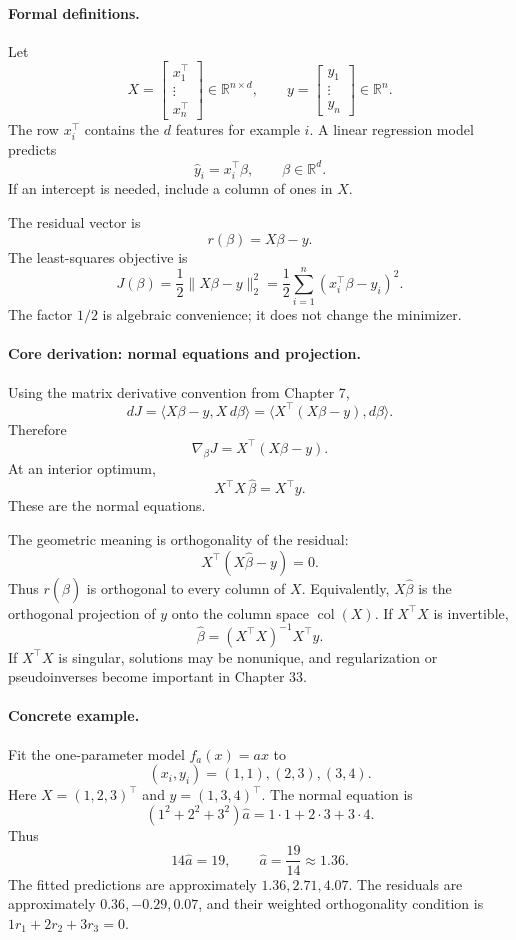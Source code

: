\paragraph{Formal definitions.}
Let
\[
X=
\begin{bmatrix}
x_1^\top\\
\vdots\\
x_n^\top
\end{bmatrix}
\in\mathbb R^{n\times d},
\qquad
y=
\begin{bmatrix}
y_1\\
\vdots\\
y_n
\end{bmatrix}
\in\mathbb R^n.
\]
The row \(x_i^\top\) contains the \(d\) features for example \(i\). A linear regression model predicts
\[
\widehat y_i=x_i^\top\beta,
\qquad
\beta\in\mathbb R^d.
\]
If an intercept is needed, include a column of ones in \(X\).

The residual vector is
\[
r(\beta)=X\beta-y.
\]
The least-squares objective is
\[
\boxed{
J(\beta)=\frac{1}{2}\|X\beta-y\|_2^2
=\frac{1}{2}\sum_{i=1}^n (x_i^\top\beta-y_i)^2.
}
\]
The factor \(1/2\) is algebraic convenience; it does not change the minimizer.

\paragraph{Core derivation: normal equations and projection.}
Using the matrix derivative convention from Chapter 7,
\[
dJ
=\langle X\beta-y, X\,d\beta\rangle
=\langle X^\top(X\beta-y),d\beta\rangle.
\]
Therefore
\[
\nabla_\beta J=X^\top(X\beta-y).
\]
At an interior optimum,
\[
\boxed{
X^\top X\,\widehat\beta=X^\top y.
}
\]
These are the normal equations.

The geometric meaning is orthogonality of the residual:
\[
X^\top(X\widehat\beta-y)=0.
\]
Thus \(r(\widehat\beta)\) is orthogonal to every column of \(X\). Equivalently, \(X\widehat\beta\) is the orthogonal projection of \(y\) onto the column space \(\operatorname{col}(X)\). If \(X^\top X\) is invertible,
\[
\widehat\beta=(X^\top X)^{-1}X^\top y.
\]
If \(X^\top X\) is singular, solutions may be nonunique, and regularization or pseudoinverses become important in Chapter 33.

\paragraph{Concrete example.}
Fit the one-parameter model \(f_a(x)=a x\) to
\[
(x_i,y_i)=(1,1),(2,3),(3,4).
\]
Here \(X=(1,2,3)^\top\) and \(y=(1,3,4)^\top\). The normal equation is
\[
(1^2+2^2+3^2)\widehat a=1\cdot1+2\cdot3+3\cdot4.
\]
Thus
\[
14\widehat a=19,\qquad \widehat a=\frac{19}{14}\approx1.36.
\]
The fitted predictions are approximately \(1.36,2.71,4.07\). The residuals are approximately \(0.36,-0.29,0.07\), and their weighted orthogonality condition is \(1r_1+2r_2+3r_3=0\).

